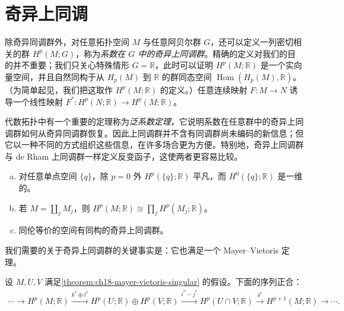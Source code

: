 \documentclass[../../main.tex]{subfiles}
\begin{document}
\section{奇异上同调}\label{section:ch18-singular-cohomology}

除奇异同调群外，对任意拓扑空间 $M$ 与任意阿贝尔群 $G$，还可以定义一列密切相关的群 $H^p(M;G)$，称为\emph{系数在 $G$ 中的奇异上同调群}。精确的定义对我们的目的并不重要；我们只关心特殊情形 $G=\mathbb{R}$，此时可以证明 $H^p(M;\mathbb{R})$ 是一个实向量空间，并且自然同构于从 $H_p(M)$ 到 $\mathbb{R}$ 的群同态空间 $\operatorname{Hom}(H_p(M),\mathbb{R})$。（为简单起见，我们把这取作 $H^p(M;\mathbb{R})$ 的定义。）任意连续映射 $F:M\to N$ 诱导一个线性映射 $F^*:H^p(N;\mathbb{R})\to H^p(M;\mathbb{R})$。

代数拓扑中有一个重要的定理称为\emph{泛系数定理}，它说明系数在任意群中的奇异上同调群如何从奇异同调群恢复。因此上同调群并不含有同调群尚未编码的新信息；但它以一种不同的方式组织这些信息，在许多场合更为方便。特别地，奇异上同调群与 de Rham 上同调群一样定义反变函子，这使两者更容易比较。

\begin{proposition}[奇异上同调的性质]\label{proposition:ch18-singular-cohomology-properties}
\begin{enumerate}[(a)]
\item 对任意单点空间 $\{q\}$，除 $p=0$ 外 $H^p(\{q\};\mathbb{R})$ 平凡，而 $H^0(\{q\};\mathbb{R})$ 是一维的。
\item 若 $M=\coprod_j M_j$，则 $H^p(M;\mathbb{R})\cong\prod_j H^p(M_j;\mathbb{R})$。
\item 同伦等价的空间有同构的奇异上同调群。
\end{enumerate}
\end{proposition}

我们需要的关于奇异上同调群的关键事实是：它也满足一个 Mayer--Vietoris 定理。

\begin{theorem}\label{theorem:ch18-mayer-vietoris-cohomology}
设 $M,U,V$ 满足\cref{theorem:ch18-mayer-vietoris-singular} 的假设。下面的序列正合：
\begin{align*}
\cdots\to H^p(M;\mathbb{R})\xrightarrow{k^*\oplus l^*}H^p(U;\mathbb{R})\oplus H^p(V;\mathbb{R})
\xrightarrow{i^*-j^*}H^p(U\cap V;\mathbb{R})\xrightarrow{\delta^*}H^{p+1}(M;\mathbb{R})\to\cdots.
\end{align*}
\end{theorem}
\end{document}
